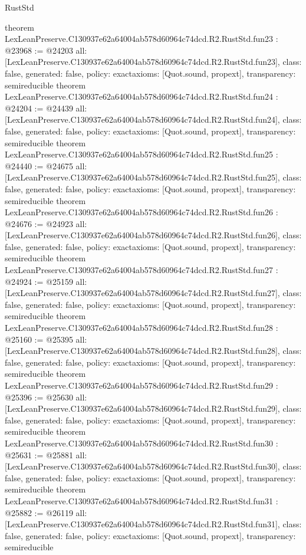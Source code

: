 \begin{lexlean}{RustStd}
\begin{coremodule}
{}
theorem LexLeanPreserve.C130937e62a64004ab578d60964c74dcd.R2.RustStd.fun23 : @23968 := @24203 {
  all: [LexLeanPreserve.C130937e62a64004ab578d60964c74dcd.R2.RustStd.fun23],
  class: false,
  generated: false,
  policy: exact{axioms: [Quot.sound, propext]},
  transparency: semireducible
}
theorem LexLeanPreserve.C130937e62a64004ab578d60964c74dcd.R2.RustStd.fun24 : @24204 := @24439 {
  all: [LexLeanPreserve.C130937e62a64004ab578d60964c74dcd.R2.RustStd.fun24],
  class: false,
  generated: false,
  policy: exact{axioms: [Quot.sound, propext]},
  transparency: semireducible
}
theorem LexLeanPreserve.C130937e62a64004ab578d60964c74dcd.R2.RustStd.fun25 : @24440 := @24675 {
  all: [LexLeanPreserve.C130937e62a64004ab578d60964c74dcd.R2.RustStd.fun25],
  class: false,
  generated: false,
  policy: exact{axioms: [Quot.sound, propext]},
  transparency: semireducible
}
theorem LexLeanPreserve.C130937e62a64004ab578d60964c74dcd.R2.RustStd.fun26 : @24676 := @24923 {
  all: [LexLeanPreserve.C130937e62a64004ab578d60964c74dcd.R2.RustStd.fun26],
  class: false,
  generated: false,
  policy: exact{axioms: [Quot.sound, propext]},
  transparency: semireducible
}
theorem LexLeanPreserve.C130937e62a64004ab578d60964c74dcd.R2.RustStd.fun27 : @24924 := @25159 {
  all: [LexLeanPreserve.C130937e62a64004ab578d60964c74dcd.R2.RustStd.fun27],
  class: false,
  generated: false,
  policy: exact{axioms: [Quot.sound, propext]},
  transparency: semireducible
}
theorem LexLeanPreserve.C130937e62a64004ab578d60964c74dcd.R2.RustStd.fun28 : @25160 := @25395 {
  all: [LexLeanPreserve.C130937e62a64004ab578d60964c74dcd.R2.RustStd.fun28],
  class: false,
  generated: false,
  policy: exact{axioms: [Quot.sound, propext]},
  transparency: semireducible
}
theorem LexLeanPreserve.C130937e62a64004ab578d60964c74dcd.R2.RustStd.fun29 : @25396 := @25630 {
  all: [LexLeanPreserve.C130937e62a64004ab578d60964c74dcd.R2.RustStd.fun29],
  class: false,
  generated: false,
  policy: exact{axioms: [Quot.sound, propext]},
  transparency: semireducible
}
theorem LexLeanPreserve.C130937e62a64004ab578d60964c74dcd.R2.RustStd.fun30 : @25631 := @25881 {
  all: [LexLeanPreserve.C130937e62a64004ab578d60964c74dcd.R2.RustStd.fun30],
  class: false,
  generated: false,
  policy: exact{axioms: [Quot.sound, propext]},
  transparency: semireducible
}
theorem LexLeanPreserve.C130937e62a64004ab578d60964c74dcd.R2.RustStd.fun31 : @25882 := @26119 {
  all: [LexLeanPreserve.C130937e62a64004ab578d60964c74dcd.R2.RustStd.fun31],
  class: false,
  generated: false,
  policy: exact{axioms: [Quot.sound, propext]},
  transparency: semireducible
}
\end{coremodule}
\end{lexlean}
